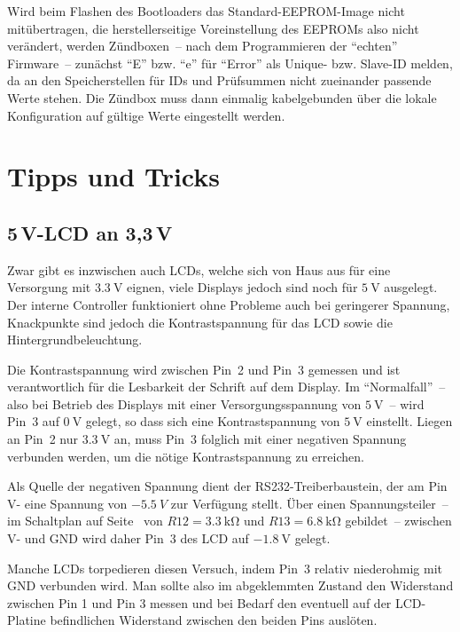 \documentclass[paper=a4, parskip, numbers=noenddot, toc=listof, headsepline]{scrbook}
\begin{document}
			Wird beim Flashen des Bootloaders das Standard-EEPROM-Image nicht mitübertragen, die herstellerseitige Voreinstellung des EEPROMs also nicht verändert, werden Zündboxen~-- nach dem Programmieren der \enquote{echten} Firmware~-- zunächst \enquote{E} bzw. \enquote{e} für \enquote{Error} als Unique- bzw. Slave-ID melden, da an den Speicherstellen für IDs und Prüfsummen nicht zueinander passende Werte stehen. Die Zündbox muss dann einmalig kabelgebunden über die lokale Konfiguration auf gültige Werte eingestellt werden.

	\chapter{Tipps und Tricks}

		\section[5V-LCD an 3,3V]{5\,V-LCD an 3,3\,V}

			Zwar gibt es inzwischen auch LCDs, welche sich von Haus aus für eine Versorgung mit $\SI{3,3}{\volt}$ eignen, viele Displays jedoch sind noch für $\SI{5}{\volt}$ ausgelegt. Der interne Controller funktioniert ohne Probleme auch bei geringerer Spannung, Knackpunkte sind jedoch die Kontrastspannung für das LCD sowie die Hintergrundbeleuchtung.

			Die Kontrastspannung wird zwischen Pin~2 und Pin~3 gemessen und ist verantwortlich für die Lesbarkeit der Schrift auf dem Display. Im \enquote{Normalfall}~-- also bei Betrieb des Displays mit einer Versorgungsspannung von $\SI{5}{\volt}$~-- wird Pin~3 auf $\SI{0}{\volt}$ gelegt, so dass sich eine Kontrastspannung von $\SI{5}{\volt}$ einstellt. Liegen an Pin~2 nur $\SI{3,3}{\volt}$ an, muss Pin~3 folglich mit einer negativen Spannung verbunden werden, um die nötige Kontrastspannung zu erreichen.

			Als Quelle der negativen Spannung dient der RS232-Treiberbaustein, der am Pin V- eine Spannung von $\SI{-5,5}{V}$ zur Verfügung stellt. Über einen Spannungsteiler~-- im Schaltplan auf Seite~\pageref{fig:transmitterschematic} von $R12 = \SI{3,3}{\kilo\ohm}$ und $R13 = \SI{6,8}{\kilo\ohm}$ gebildet~-- zwischen V- und GND wird daher Pin~3 des LCD auf $\SI{-1,8}{\volt}$ gelegt.

			Manche LCDs torpedieren diesen Versuch, indem Pin~3 relativ niederohmig mit GND verbunden wird. Man sollte also im abgeklemmten Zustand den Widerstand zwischen Pin 1 und Pin 3 messen und bei Bedarf den eventuell auf der LCD-Platine befindlichen Widerstand zwischen den beiden Pins auslöten.
\end{document}
